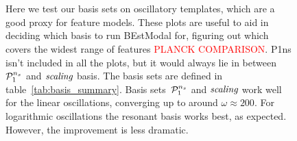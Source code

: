 \begin{figure}[!pth]
\centering
{}\\
\\
\caption{
    Here we test our basis sets on oscillatory templates, which are a good proxy for feature models.
    These plots are useful to aid in deciding which basis to run BEstModal for,
    figuring out which covers the widest range of features \textcolor{red}{PLANCK COMPARISON}.
    P1ns isn't included in all the plots, but it would always lie in between~$\mathcal{P}^{n_s}_1$ and $\textit{scaling}$ basis.
    The basis sets are defined in table~\ref{tab:basis_summary}.
    Basis sets~$\mathcal{P}^{n_s}_1$ and $\textit{scaling}$ work well for the linear oscillations,
    converging up to around $\omega\approx200$.
    For logarithmic oscillations the resonant basis works best, as expected.
    However, the improvement is less dramatic.
    }\label{fig:plot_freq_scan}
\end{figure}
